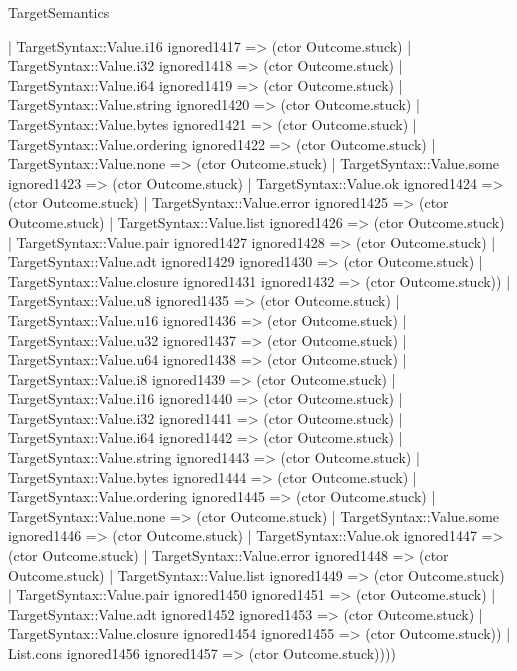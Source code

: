 \begin{lexlean}{TargetSemantics}
\begin{semanticmodule}
{              | TargetSyntax::Value.i16 ignored1417 => (ctor Outcome.stuck)
              | TargetSyntax::Value.i32 ignored1418 => (ctor Outcome.stuck)
              | TargetSyntax::Value.i64 ignored1419 => (ctor Outcome.stuck)
              | TargetSyntax::Value.string ignored1420 => (ctor Outcome.stuck)
              | TargetSyntax::Value.bytes ignored1421 => (ctor Outcome.stuck)
              | TargetSyntax::Value.ordering ignored1422 => (ctor Outcome.stuck)
              | TargetSyntax::Value.none => (ctor Outcome.stuck)
              | TargetSyntax::Value.some ignored1423 => (ctor Outcome.stuck)
              | TargetSyntax::Value.ok ignored1424 => (ctor Outcome.stuck)
              | TargetSyntax::Value.error ignored1425 => (ctor Outcome.stuck)
              | TargetSyntax::Value.list ignored1426 => (ctor Outcome.stuck)
              | TargetSyntax::Value.pair ignored1427 ignored1428 => (ctor Outcome.stuck)
              | TargetSyntax::Value.adt ignored1429 ignored1430 => (ctor Outcome.stuck)
              | TargetSyntax::Value.closure ignored1431 ignored1432 => (ctor Outcome.stuck))
            | TargetSyntax::Value.u8 ignored1435 => (ctor Outcome.stuck)
            | TargetSyntax::Value.u16 ignored1436 => (ctor Outcome.stuck)
            | TargetSyntax::Value.u32 ignored1437 => (ctor Outcome.stuck)
            | TargetSyntax::Value.u64 ignored1438 => (ctor Outcome.stuck)
            | TargetSyntax::Value.i8 ignored1439 => (ctor Outcome.stuck)
            | TargetSyntax::Value.i16 ignored1440 => (ctor Outcome.stuck)
            | TargetSyntax::Value.i32 ignored1441 => (ctor Outcome.stuck)
            | TargetSyntax::Value.i64 ignored1442 => (ctor Outcome.stuck)
            | TargetSyntax::Value.string ignored1443 => (ctor Outcome.stuck)
            | TargetSyntax::Value.bytes ignored1444 => (ctor Outcome.stuck)
            | TargetSyntax::Value.ordering ignored1445 => (ctor Outcome.stuck)
            | TargetSyntax::Value.none => (ctor Outcome.stuck)
            | TargetSyntax::Value.some ignored1446 => (ctor Outcome.stuck)
            | TargetSyntax::Value.ok ignored1447 => (ctor Outcome.stuck)
            | TargetSyntax::Value.error ignored1448 => (ctor Outcome.stuck)
            | TargetSyntax::Value.list ignored1449 => (ctor Outcome.stuck)
            | TargetSyntax::Value.pair ignored1450 ignored1451 => (ctor Outcome.stuck)
            | TargetSyntax::Value.adt ignored1452 ignored1453 => (ctor Outcome.stuck)
            | TargetSyntax::Value.closure ignored1454 ignored1455 => (ctor Outcome.stuck))
          | List.cons ignored1456 ignored1457 => (ctor Outcome.stuck))))
}
\end{semanticmodule}
\end{lexlean}
